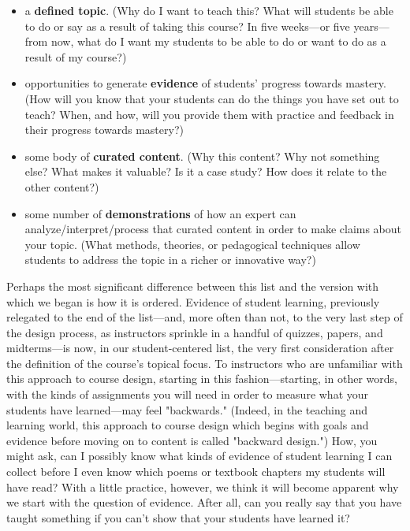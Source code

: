 \begin{itemize}
\item a \textbf{defined topic}. (Why do I want to teach this? What will students be able to do or say as a result of taking this course? In five weeks—or five years—from now, what do I want my students to be able to do or want to do as a result of my course?)

  
\item opportunities to generate \textbf{evidence} of students' progress towards mastery. (How will you know that your students can do the things you have set out to teach? When, and how, will you provide them with practice and feedback in their progress towards mastery?)
  
\item some body of \textbf{curated content}. (Why this content? Why not something else? What makes it valuable? Is it a case study? How does it relate to the other content?)
  
\item some number of \textbf{demonstrations} of how an expert can analyze/interpret/process that curated content in order to make claims about your topic. (What methods, theories, or pedagogical techniques allow students to address the topic in a richer or innovative way?)
\end{itemize}


Perhaps the most significant difference between this list and the version with which we began is how it is ordered. Evidence of student learning, previously relegated to the end of the list—and, more often than not, to the very last step of the design process, as instructors sprinkle in a handful of quizzes, papers, and midterms—is now, in our student-centered list, the very first consideration after the definition of the course’s topical focus. To instructors who are unfamiliar with this approach to course design, starting in this fashion—starting, in other words, with the kinds of assignments you will need in order to measure what your students have learned—may feel "backwards." (Indeed, in the teaching and learning world, this approach to course design which begins with goals and evidence before moving on to content is called "backward design.") How, you might ask, can I possibly know what kinds of evidence of student learning I can collect before I even know which poems or textbook chapters my students will have read? With a little practice, however, we think it will become apparent why we start with the question of evidence. After all, can you really say that you have taught something if you can’t show that your students have learned it?

